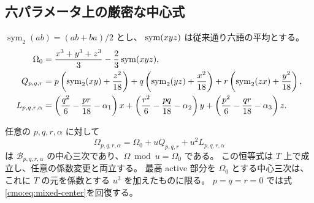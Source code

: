 \subsection{六パラメータ上の厳密な中心式}

$\operatorname{sym}_2(ab)=(ab+ba)/2$ とし、
$\operatorname{sym}(xyz)$ は従来通り六語の平均とする。
\begin{align*}
 \Omega_0&=\frac{x^3+y^3+z^3}{3}-\frac23\operatorname{sym}(xyz),\\
 Q_{p,q,r}&=p\left(\operatorname{sym}_2(xy)+\frac{z^2}{18}\right)
      +q\left(\operatorname{sym}_2(yz)+\frac{x^2}{18}\right)
      +r\left(\operatorname{sym}_2(zx)+\frac{y^2}{18}\right),\\
 L_{p,q,r,\alpha}
   &=\left(\frac{q^2}{6}-\frac{pr}{18}-\alpha_1\right)x
     +\left(\frac{r^2}{6}-\frac{pq}{18}-\alpha_2\right)y
     +\left(\frac{p^2}{6}-\frac{qr}{18}-\alpha_3\right)z.
\end{align*}

\begin{theorem}[普遍中心三次]
\label{mix:thm:linear-pbw-central-cubic}
任意の $p,q,r,\alpha$ に対して
\begin{equation}\label{mix:eq:linear-pbw-central-cubic}
        \Omega_{p,q,r,\alpha}
              =\Omega_0+uQ_{p,q,r}+u^2L_{p,q,r,\alpha}
\end{equation}
は $\mathcal B_{p,q,r,\alpha}$ の中心三次であり、$\Omega\bmod u=\Omega_0$ である。
この恒等式は $T$ 上で成立し、任意の係数変更と両立する。
最高 active 部分を $\Omega_0$ とする中心三次は、これに
$T$ の元を係数とする $u^3$ を加えたものに限る。
$p=q=r=0$ では式\eqref{cmo:eq:mixed-center}を回復する。
\end{theorem}

